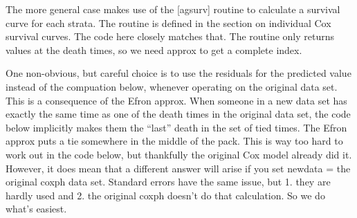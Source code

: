 \documentclass{article}
\begin{document}
The more general case makes use of the [agsurv] routine to calculate
a survival curve for each strata.  The routine is defined in the
section on individual Cox survival curves.  The code here closely matches
that.  The routine only returns values at the death times, so we need
approx to get a complete index.

One non-obvious, but careful choice is to use the residuals for the predicted
value instead of the compuation below, whenever operating on the original 
data set.  This is a consequence of the Efron approx.  When someone in
a new data set has exactly the same time as one of the death times in the
original data set, the code below implicitly makes them the ``last'' death
in the set of tied times.  
The Efron approx puts a tie somewhere in the middle of the pack.  This is
way too hard to work out in the code below, but thankfully the original
Cox model already did it.  However, it does mean that a different answer will
arise if you set newdata = the original coxph data set.  
Standard errors have the same issue, but 1. they are hardly used and 2. the
original coxph doesn't do that calculation. So we do what's easiest.
\end{document}
